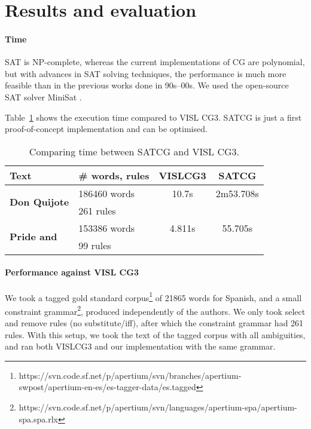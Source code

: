 \documentclass[11pt]{article}
\begin{document}
\section{Results and evaluation}

\paragraph{Time}

SAT is NP-complete, whereas the current implementations of CG are polynomial, 
but with advances in SAT solving techniques, 
the performance is much more feasible than in the previous works done in 90s--00s.
We used the open-source SAT solver MiniSat \cite{een04sat}.

Table~\ref{table:time} shows the execution time compared to VISL CG3.
SATCG is just a first proof-of-concept implementation and can be optimised.

\begin{table}
  \centering
  \begin{tabular}{|l|l|c|c|}
     \hline
	        \textbf{Text} & \textbf{\# words, rules} & \textbf{VISLCG3} &  \textbf{SATCG} \\ \hline
    \multirow{2}{*}{\textbf{Don Quijote}} & 186460 words  & 10.7s &  2m53.708s \\ 
		                                           & 261 rules & & \\ \hline
    \multirow{2}{*}{\textbf{Pride and}}  & 153386 words & 4.811s & 55.705s \\ 
                         {\textbf{Prejudice}}                   & 99 rules & \\ \hline
  \end{tabular}
  \caption{Comparing time between SATCG and VISL CG3.}
  \label{table:time}
\end{table}

\paragraph{Performance against VISL CG3}


We took a tagged gold standard corpus\footnote{https://svn.code.sf.net/p/apertium/svn/branches/apertium-swpost/apertium-en-es/es-tagger-data/es.tagged} of 21865 words for Spanish, 
and a small constraint grammar\footnote{https://svn.code.sf.net/p/apertium/svn/languages/apertium-spa/apertium-spa.spa.rlx}, produced independently of the authors.
We only took select and remove rules (no substitute/iff), after which the constraint grammar had 261 rules.
With this setup, we took the text of the tagged corpus with all ambiguities, and ran both VISLCG3 and our implementation with the same grammar. 
\end{document}
